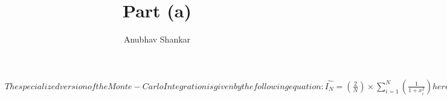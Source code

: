 \documentclass[a4paper,12pt] {article}
\title{Part (a)}
\author{Anubhav Shankar}
\begin{document}
	\maketitle

$

	The specialized version of the Monte-Carlo Integration is given by
	the following equation:


	
	\hat{I_N} =  \left(\frac{2}{N}\right)  \times  \sum \limits_{i=1} ^ N \left(\frac{1}{1+x_i^2}\right)




	here,         x_i \in [a,b] 



	also,         V = b-a 




	where, a and b are the lower and upper bounds respectively.

$
\end{document}
